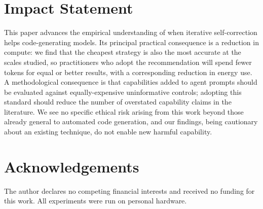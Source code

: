 \documentclass{article}
\begin{document}




\section*{Impact Statement}

This paper advances the empirical understanding of when iterative
self-correction helps code-generating models. Its principal practical
consequence is a reduction in compute: we find that the cheapest strategy is
also the most accurate at the scales studied, so practitioners who adopt the
recommendation will spend fewer tokens for equal or better results, with a
corresponding reduction in energy use. A methodological consequence is that
capabilities added to agent prompts should be evaluated against
equally-expensive uninformative controls; adopting this standard should reduce
the number of overstated capability claims in the literature. We see no
specific ethical risk arising from this work beyond those already general to
automated code generation, and our findings, being cautionary about an existing
technique, do not enable new harmful capability.

\section*{Acknowledgements}

The author declares no competing financial interests and received no funding
for this work. All experiments were run on personal hardware.
\end{document}
